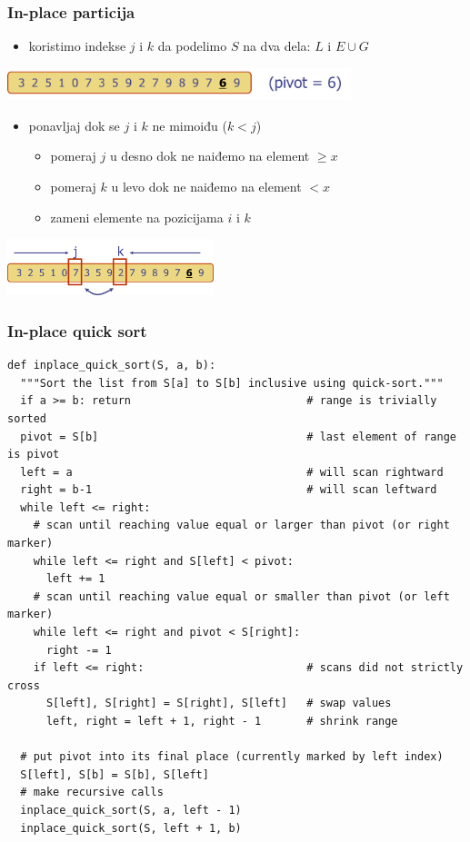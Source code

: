 \documentclass[compress]{beamer}
\begin{document}
\begin{frame}[fragile]
  \frametitle{In-place particija}
  \begin{itemize}
    \item koristimo indekse $j$ i $k$ da podelimo $S$ na dva dela: $L$ i $E\cup G$
  \end{itemize}
  \begin{center}
    \includegraphics[width=10cm]{asp-12-pic26.png}
  \end{center}
  \begin{itemize}
    \item ponavljaj dok se $j$ i $k$ ne mimoiđu ($k<j$)
    \begin{itemize}
      \item pomeraj $j$ u desno dok ne naiđemo na element $\geq x$ 
      \item pomeraj $k$ u levo dok ne naiđemo na element $< x$
      \item zameni elemente na pozicijama $i$ i $k$ 
    \end{itemize}
  \end{itemize}
  \begin{center}
    \includegraphics[width=6cm]{asp-12-pic27.png}
  \end{center}
\end{frame}

\begin{frame}[fragile,shrink=25]
  \frametitle{In-place quick sort}
\begin{verbatim}
def inplace_quick_sort(S, a, b):
  """Sort the list from S[a] to S[b] inclusive using quick-sort."""
  if a >= b: return                           # range is trivially sorted
  pivot = S[b]                                # last element of range is pivot
  left = a                                    # will scan rightward
  right = b-1                                 # will scan leftward
  while left <= right:
    # scan until reaching value equal or larger than pivot (or right marker)
    while left <= right and S[left] < pivot:
      left += 1
    # scan until reaching value equal or smaller than pivot (or left marker)
    while left <= right and pivot < S[right]:
      right -= 1
    if left <= right:                         # scans did not strictly cross
      S[left], S[right] = S[right], S[left]   # swap values
      left, right = left + 1, right - 1       # shrink range

  # put pivot into its final place (currently marked by left index)
  S[left], S[b] = S[b], S[left]
  # make recursive calls
  inplace_quick_sort(S, a, left - 1)
  inplace_quick_sort(S, left + 1, b)
\end{verbatim}
\end{frame}
\end{document}
